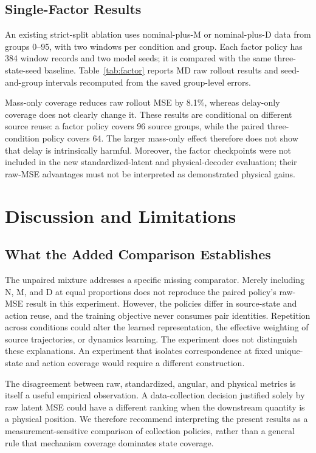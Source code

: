 \subsection{Single-Factor Results}
An existing strict-split ablation uses nominal-plus-M or nominal-plus-D data from groups 0--95, with two windows per condition and group. Each factor policy has 384 window records and two model seeds; it is compared with the same three-state-seed baseline. Table~\ref{tab:factor} reports MD raw rollout results and seed-and-group intervals recomputed from the saved group-level errors.

Mass-only coverage reduces raw rollout MSE by 8.1\%, whereas delay-only coverage does not clearly change it. These results are conditional on different source reuse: a factor policy covers 96 source groups, while the paired three-condition policy covers 64. The larger mass-only effect therefore does not show that delay is intrinsically harmful. Moreover, the factor checkpoints were not included in the new standardized-latent and physical-decoder evaluation; their raw-MSE advantages must not be interpreted as demonstrated physical gains.



\section{Discussion and Limitations}
\subsection{What the Added Comparison Establishes}
The unpaired mixture addresses a specific missing comparator. Merely including N, M, and D at equal proportions does not reproduce the paired policy's raw-MSE result in this experiment. However, the policies differ in source-state and action reuse, and the training objective never consumes pair identities. Repetition across conditions could alter the learned representation, the effective weighting of source trajectories, or dynamics learning. The experiment does not distinguish these explanations. An experiment that isolates correspondence at fixed unique-state and action coverage would require a different construction.

The disagreement between raw, standardized, angular, and physical metrics is itself a useful empirical observation. A data-collection decision justified solely by raw latent MSE could have a different ranking when the downstream quantity is a physical position. We therefore recommend interpreting the present results as a measurement-sensitive comparison of collection policies, rather than a general rule that mechanism coverage dominates state coverage.

